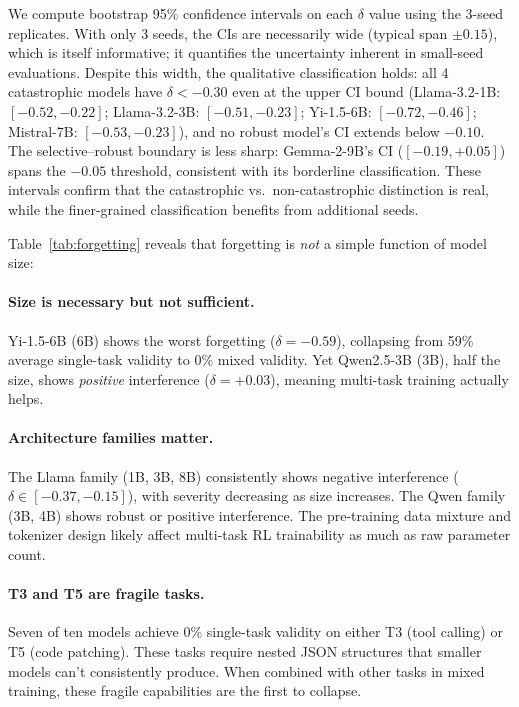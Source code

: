 \documentclass[11pt]{article}
\begin{document}
We compute bootstrap 95\% confidence intervals on each $\delta$ value using the 3-seed replicates.  With only 3 seeds, the CIs are necessarily wide (typical span $\pm 0.15$), which is itself informative; it quantifies the uncertainty inherent in small-seed evaluations.  Despite this width, the qualitative classification holds: all 4 catastrophic models have $\delta < -0.30$ even at the upper CI bound (Llama-3.2-1B: $[-0.52, -0.22]$; Llama-3.2-3B: $[-0.51, -0.23]$; Yi-1.5-6B: $[-0.72, -0.46]$; Mistral-7B: $[-0.53, -0.23]$), and no robust model's CI extends below $-0.10$.  The selective--robust boundary is less sharp: Gemma-2-9B's CI ($[-0.19, +0.05]$) spans the $-0.05$ threshold, consistent with its borderline classification.  These intervals confirm that the catastrophic vs.\ non-catastrophic distinction is real, while the finer-grained classification benefits from additional seeds.

Table~\ref{tab:forgetting} reveals that forgetting is \emph{not} a simple function of model size:

\paragraph{Size is necessary but not sufficient.}
Yi-1.5-6B (6B) shows the worst forgetting ($\delta = -0.59$), collapsing from 59\% average single-task validity to 0\% mixed validity.  Yet Qwen2.5-3B (3B), half the size, shows \emph{positive} interference ($\delta = +0.03$), meaning multi-task training actually helps.

\paragraph{Architecture families matter.}
The Llama family (1B, 3B, 8B) consistently shows negative interference ($\delta \in [-0.37, -0.15]$), with severity decreasing as size increases.  The Qwen family (3B, 4B) shows robust or positive interference.  The pre-training data mixture and tokenizer design likely affect multi-task RL trainability as much as raw parameter count.

\paragraph{T3 and T5 are fragile tasks.}
Seven of ten models achieve 0\% single-task validity on either T3 (tool calling) or T5 (code patching).  These tasks require nested JSON structures that smaller models can't consistently produce.  When combined with other tasks in mixed training, these fragile capabilities are the first to collapse.
\end{document}
